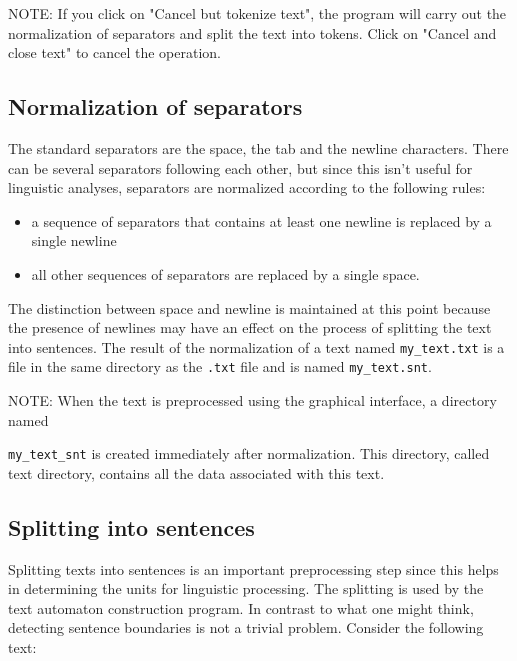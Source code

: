 \bigskip
\noindent NOTE: If you click on "Cancel but tokenize text", the program will
carry out the normalization of separators and split the text into tokens. Click
on "Cancel and close text" to cancel the operation.

\subsection{Normalization of separators}
The standard separators are the space, the tab and the newline characters. There
can be several separators following each other, but since this isn't useful for
linguistic analyses, separators are normalized according to the following rules:

\begin{itemize}
  \item a sequence of separators that contains at least one newline is replaced by a single newline
  
  \item all other sequences of separators are replaced by a single space.
\end{itemize}

\noindent 
The distinction between space and newline is maintained at this point because the
presence of newlines may have an effect on the process of splitting the text into
sentences. The result of the normalization of a text named  \verb+my_text.txt+ is
a file in the same directory as the \verb+.txt+ file and is named
\verb+my_text.snt+. 

\bigskip
\noindent NOTE: When the text is preprocessed using the graphical interface, a
directory named

\noindent \verb+my_text_snt+ is created immediately after normalization.
This directory, called text directory,  
 contains all the data associated with this text.



\subsection{Splitting into sentences}
\label{section-sentence-splitting}
Splitting texts into sentences is an important preprocessing step since  this
helps in determining the units for linguistic processing. The splitting is used
by the text automaton construction program. In contrast to what one might think,
detecting sentence boundaries is not a trivial problem. Consider the following
text:


